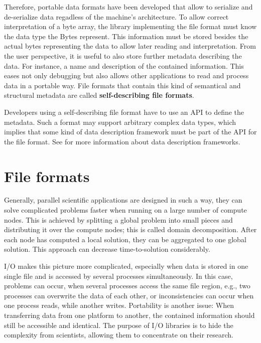 \documentclass{../../template/esiwace-report}
\begin{document}
Therefore, portable data formats have been developed that allow to serialize and de-serialize data regadless of the machine's architecture.
To allow correct interpretation of a byte array, the library implementing the file format must know the data type the Bytes represent.
This information must be stored besides the actual bytes representing the data to allow later reading and interpretation.
From the user perspective, it is useful to also store further metadata describing the data.
For instance, a name and description of the contained information.
This eases not only debugging but also allows other applications to read and process data in a portable way.
File formats that contain this kind of semantical and structural metadata are called \textbf{self-describing file formats}.

Developers using a self-describing file format have to use an API to define the metadata.
Such a format may support arbitrary complex data types, which implies that some kind of data description framework must be part of the API for the file format.
See  for more information about data description frameworks.


\section{File formats}
Generally, parallel scientific applications are designed in such a way, they can solve complicated problems faster when running on a large number of compute nodes.
This is achieved by splitting a global problem into small pieces and distributing it over the compute nodes; this is called domain decomposition.
After each node has computed a local solution, they can be aggregated to one global solution.
This approach can decrease time-to-solution considerably.

I/O makes this picture more complicated, especially when data is stored in one single file and is accessed by several processes simultaneously.
In this case, problems can occur, when several processes access the same file region, e.g., two processes can overwrite the data of each other, or inconsistencies can occur when one process reads, while another writes.
Portability is another issue: When transferring data from one platform to another, the contained information should still be accessible and identical.
The purpose of I/O libraries is to hide the complexity from scientists, allowing them to concentrate on their research.
\end{document}
